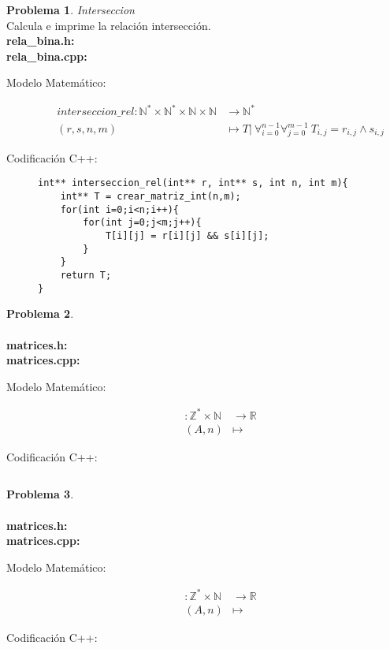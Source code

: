 \documentclass{article}
\theoremstyle{plain}
\theoremstyle{definition}
\newtheorem{problem}{Problema}
\begin{document}
\begin{problem}\emph{Interseccion}\\
Calcula e imprime la relación intersección.\\
\textbf{rela\_bina.h:}\ \\
\textbf{rela\_bina.cpp:}\ 
%
\begin{description}
\item[Modelo Matemático:]
%
\begin{align*}
interseccion\_rel: \mathbb{N}^*\times\mathbb{N}^*\times\mathbb{N}\times\mathbb{N} &\to \mathbb{N}^*\\
(r,s,n,m) &\mapsto T|\ \forall_{i=0}^{n-1} \forall_{j=0}^{m-1}\ T_{i,j} = r_{i,j} \wedge s_{i,j}
\end{align*}
%
\item[Codificación \textsf{C++}:]\hfill
%
\begin{verbatim}
int** interseccion_rel(int** r, int** s, int n, int m){
    int** T = crear_matriz_int(n,m);
    for(int i=0;i<n;i++){
        for(int j=0;j<m;j++){
            T[i][j] = r[i][j] && s[i][j];
        }
    }
    return T;
}
\end{verbatim}
\end{description}
\end{problem}

\begin{problem} \emph{}\\
\\
\textbf{matrices.h:}\ \\
\textbf{matrices.cpp:}\ 
%
\begin{description}
\item[Modelo Matemático:]
%
\begin{align*}
: \mathbb{Z}^*\times\mathbb{N} &\to \mathbb{R}\\
(A,n) &\mapsto 
\end{align*}
%
\item[Codificación \textsf{C++}:]\hfill
%
\begin{verbatim}

\end{verbatim}
\end{description}
\end{problem}

\begin{problem} \emph{}\\
\\
\textbf{matrices.h:}\ \\
\textbf{matrices.cpp:}\ 
%
\begin{description}
\item[Modelo Matemático:]
%
\begin{align*}
: \mathbb{Z}^*\times\mathbb{N} &\to \mathbb{R}\\
(A,n) &\mapsto 
\end{align*}
%
\item[Codificación \textsf{C++}:]\hfill
%
\begin{verbatim}

\end{verbatim}
\end{description}
\end{problem}
\end{document}
